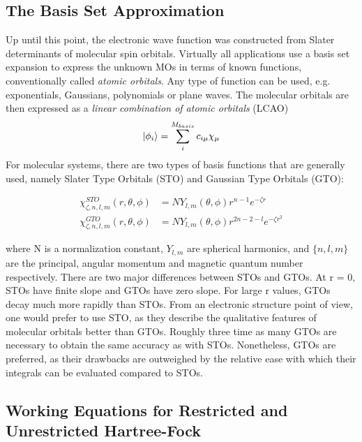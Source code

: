 \subsection{The Basis Set Approximation}

Up until this point, the electronic wave function was constructed from Slater determinants of molecular spin orbitals. Virtually all applications use a basis set expansion to express the unknown MOs in terms of known functions, conventionally called \emph{atomic orbitals}. Any type of function can be used, e.g. exponentials, Gaussians, polynomials or plane waves. The molecular orbitals are then expressed as a \emph{linear combination of atomic orbitals} (LCAO)
\begin{equation}
\ket{\phi_i} = \sum_i^{M_{basis}} c_{i\mu} \chi_{\mu} 
\end{equation}
\noindent For molecular systems, there are two types of basis functions that are generally used, namely Slater Type Orbitals (STO) and Gaussian Type Orbitals (GTO):

\begin{align}
\chi_{\zeta, n, l, m}^{STO} (r,\theta ,\phi ) &= N Y_{l,m} (\theta , \phi ) r^{n-1} e^{-\zeta r}
\\
\chi_{\zeta, n, l, m}^{GTO} (r,\theta ,\phi ) &= N Y_{l,m} (\theta , \phi ) r^{2n - 2 - l} e^{-\zeta r^2}
\end{align}

\noindent where N is a normalization constant, $Y_{l,m}$ are spherical harmonics, and $\{n,l,m\}$ are the principal, angular momentum and magnetic quantum number respectively. There are two major differences between STOs and GTOs. At r = 0, STOs have finite slope and GTOs have zero slope. For large r values, GTOs decay much more rapidly than STOs. From an electronic structure point of view, one would prefer to use STO, as they describe the qualitative features of molecular orbitals better than GTOs. Roughly three time as many GTOs are necessary to obtain the same accuracy as with STOs. Nonetheless, GTOs are preferred, as their drawbacks are outweighed by the relative ease with which their integrals can be evaluated compared to STOs.

\subsection{Working Equations for Restricted and Unrestricted Hartree-Fock}

